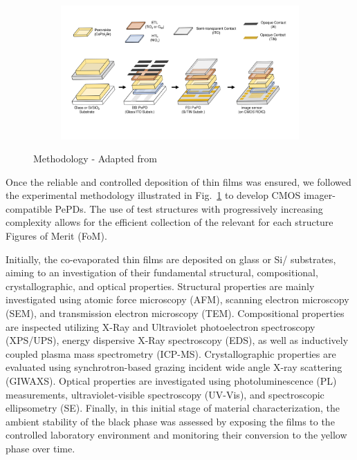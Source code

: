 \begin{figure}[htbp]
    \centering
    \begin{subfigure}[t]{0.99\textwidth} %
        \centering
        \includegraphics[width=\textwidth]{chapters/material_properties/images/methodology.pdf} %
    \end{subfigure}

    \caption{Methodology - Adapted from \cite{Malinowski2023ImageAbsorbers}}
    \label{fig:ch2:methodology}
\end{figure}

Once the reliable and controlled deposition of  thin films was ensured, we followed the experimental methodology illustrated in Fig.~\ref{fig:ch2:methodology} to develop CMOS imager-compatible PePDs. The use of test structures with progressively increasing complexity allows for the efficient collection of the relevant for each structure Figures of Merit (FoM). 

Initially, the co-evaporated  thin films are deposited on glass or Si/ substrates, aiming to an investigation of their fundamental structural, compositional, crystallographic, and optical properties. Structural properties are mainly investigated using atomic force microscopy (AFM), scanning electron microscopy (SEM), and transmission electron microscopy (TEM). Compositional properties are inspected utilizing X-Ray and Ultraviolet photoelectron spectroscopy (XPS/UPS), energy dispersive X-Ray spectroscopy (EDS), as well as inductively coupled plasma mass spectrometry (ICP-MS). Crystallographic properties are evaluated using synchrotron-based grazing incident wide angle X-ray scattering (GIWAXS). Optical properties are investigated using photoluminescence (PL) measurements, ultraviolet-visible spectroscopy (UV-Vis), and spectroscopic ellipsometry (SE). Finally, in this initial stage of material characterization, the ambient stability of the  black phase was assessed by exposing the films to the controlled laboratory environment and monitoring their conversion to the yellow phase over time.

